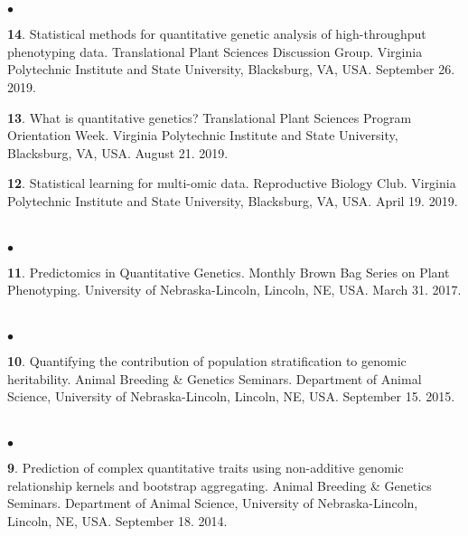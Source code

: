\documentclass[margin,line,10pt]{res}
\newenvironment{list2}{
  \begin{list}{$\bullet$}{%
      \setlength{\itemsep}{0in}
      \setlength{\parsep}{0in} \setlength{\parskip}{0in}
      \setlength{\topsep}{0in} \setlength{\partopsep}{0in} 
      \setlength{\leftmargin}{0.2in}}}{\end{list}}
\begin{document}
\begin{resume}
\section{}
\begin{list2}
\item [{\bf 14}.] Statistical methods for quantitative genetic analysis of high-throughput phenotyping data. Translational Plant Sciences Discussion Group. Virginia Polytechnic Institute and State University, Blacksburg, VA, USA. September 26. 2019.

  \vspace{0.5cm}

\item [{\bf 13}.] What is quantitative genetics? Translational Plant Sciences Program Orientation Week. Virginia Polytechnic Institute and State University, Blacksburg, VA, USA. August 21. 2019.
  
  \vspace{0.5cm}

\item [{\bf 12}.] Statistical learning for multi-omic data. Reproductive Biology Club. Virginia Polytechnic Institute and State University, Blacksburg, VA, USA. April 19. 2019.
\end{list2}  

\section{}
\begin{list2}
\item [{\bf 11}.] Predictomics in Quantitative Genetics. Monthly Brown Bag Series on Plant Phenotyping. University of Nebraska-Lincoln, Lincoln, NE, USA. March 31. 2017.
\end{list2}  

\section{}
\begin{list2}
\item  [{\bf 10}.] Quantifying the contribution of population stratification to genomic heritability. Animal Breeding \& Genetics Seminars. Department of Animal Science, University of Nebraska-Lincoln, Lincoln, NE, USA. September 15. 2015. 
\end{list2}  

\section{}
\begin{list2}
\item  [{\bf 9}.] Prediction of complex quantitative traits using non-additive genomic relationship kernels and bootstrap aggregating. Animal Breeding \& Genetics Seminars. Department of Animal Science, University of Nebraska-Lincoln, Lincoln, NE, USA. September 18. 2014. 
\vspace{0.5cm}


\end{list2}
\end{resume}
\end{document}
